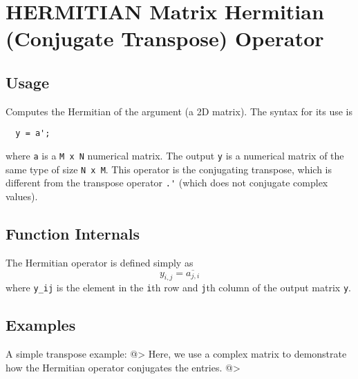 \section{HERMITIAN Matrix Hermitian (Conjugate Transpose) Operator}

\subsection{Usage}

Computes the Hermitian of the argument (a 2D matrix).  The syntax for its use is
\begin{verbatim}
  y = a';
\end{verbatim}
where \verb|a| is a \verb|M x N| numerical matrix.  The output \verb|y| is a numerical matrix
of the same type of size \verb|N x M|.  This operator is the conjugating transpose,
which is different from the transpose operator \verb|.'| (which does not 
conjugate complex values).
\subsection{Function Internals}

The Hermitian operator is defined simply as
\[
  y_{i,j} = \overline{a_{j,i}}
\]
where \verb|y_ij| is the element in the \verb|i|th row and \verb|j|th column of the output matrix \verb|y|.
\subsection{Examples}

A simple transpose example:
@>
Here, we use a complex matrix to demonstrate how the Hermitian operator conjugates the entries.
@>
